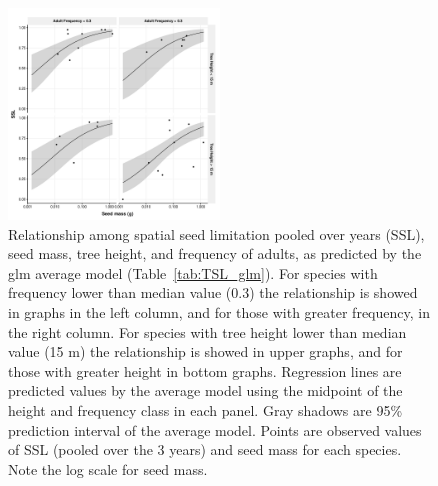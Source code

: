\documentclass[A4]{article}
\begin{document}
\begin{figure}
  \centering
  \includegraphics[width=0.5\textwidth]{../figures/SSL_all_pred_prob_glm}
  \caption{Relationship among spatial seed limitation pooled over
    years (SSL), seed mass, tree height, and frequency of adults, as
    predicted by the glm average model (Table~\ref{tab:TSL_glm}). For species with
    frequency lower than median value (0.3) the relationship is showed
    in graphs in the left column, and for those with greater
    frequency, in the right column. For species with tree height lower
    than median value (15 m) the relationship is showed in upper
    graphs, and for those with greater height in bottom
    graphs. Regression lines are predicted values by the average model
    using the midpoint of the height and frequency class in each
    panel. Gray shadows are 95\% prediction interval of the average
    model. Points are observed values of SSL (pooled over the 3 years)
    and seed mass for each species. Note the log scale for seed mass.}
  \label{fig:SSL_glm}
\end{figure}
\end{document}
